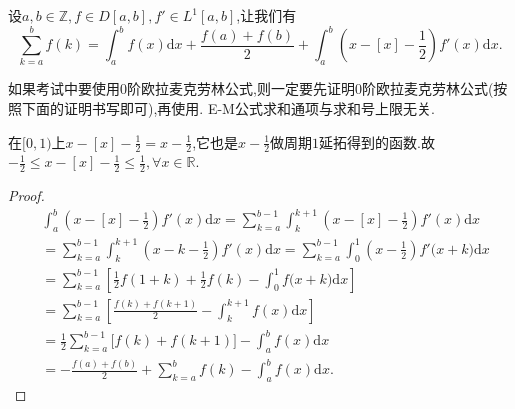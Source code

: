 \documentclass[../../main.tex]{subfiles}%
\begin{document}
\begin{theorem}\label{theorem:0阶Euler-Maclaurin公式(0阶E-M公式)}
设\(a,b\in\mathbb{Z}, f\in D[a,b], f'\in L^1[a,b]\),让我们有
\[
\sum\limits_{k = a}^{b}f(k)=\int_{a}^{b}f(x)\mathrm{d}x+\frac{f(a)+f(b)}{2}+\int_{a}^{b}\left(x - [x]-\frac{1}{2}\right)f'(x)\mathrm{d}x.
\]
\end{theorem}
\begin{remark}
如果考试中要使用0阶欧拉麦克劳林公式,则一定要先证明0阶欧拉麦克劳林公式(按照下面的证明书写即可),再使用.
E-M公式求和通项与求和号上限无关.
\end{remark}
\begin{note}
在\([0,1)\)上\(x - [x]-\frac{1}{2}=x - \frac{1}{2}\),它也是\(x - \frac{1}{2}\)做周期\(1\)延拓得到的函数.故$-\frac{1}{2}\leqslant x-[x]-\frac{1}{2}\leqslant \frac{1}{2},\forall x\in \mathbb{R} .$
\end{note}
\begin{proof}
\begin{align*}
&\int_a^b{\left( x-[x]-\frac{1}{2} \right) f'(x)\mathrm{d}x}=\sum\limits_{k=a}^{b-1}{\int_k^{k+1}{\left( x-[x]-\frac{1}{2} \right) f'(x)\mathrm{d}x}}
\\
&=\sum\limits_{k=a}^{b-1}{\int_k^{k+1}{\left( x-k-\frac{1}{2} \right) f'(x)\mathrm{d}x}}=\sum\limits_{k=a}^{b-1}{\int_0^1{\left( x-\frac{1}{2} \right) f'(x}}+k)\mathrm{d}x
\\
&=\sum\limits_{k=a}^{b-1}{\left[ \frac{1}{2}f(1+k)+\frac{1}{2}f(k)-\int_0^1{f(x}+k)\mathrm{d}x \right]}
\\
&=\sum\limits_{k=a}^{b-1}{\left[ \frac{f(k)+f(k+1)}{2}-\int_k^{k+1}{f(x)\mathrm{d}x} \right]}
\\
&=\frac{1}{2}\sum\limits_{k=a}^{b-1}{[f(k)}+f(k+1)]-\int_a^b{f(x)\mathrm{d}x}
\\
&=-\frac{f(a)+f(b)}{2}+\sum\limits_{k=a}^b{f(k)}-\int_a^b{f(x)\mathrm{d}x}.
\end{align*}
\end{proof}
\end{document}
